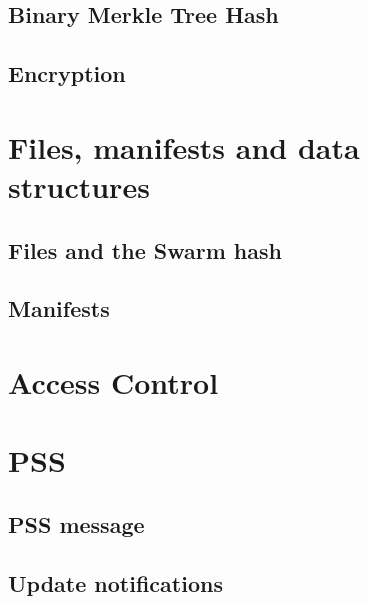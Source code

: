 \subsection{Binary Merkle Tree Hash \statusyellow}\label{spec:format:bmt}

\subsection{Encryption \statusyellow}\label{spec:format:encryption}


\section{Files, manifests and data structures\statusyellow}\label{spec:format:data-structures}
\subsection{Files and the Swarm hash \statusyellow}\label{spec:format:files}

\subsection{Manifests \statusyellow}\label{spec:format:manifests}

%


\section{Access Control \statusgreen}\label{spec:format:access-control}


\section{PSS \statusyellow}

\subsection{PSS message\statusgreen}
\label{spec:format:pss-messsage}

\subsection{Update notifications \statusred}\label{spec:format:update-notifications}
%

